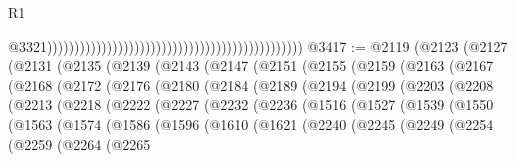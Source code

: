 \begin{lexlean}{R1}
\begin{coremodule}
                                                                                                  @3321)))))))))))))))))))))))))))))))))))))))))))))))
@3417 := @2119
    (@2123
      (@2127
        (@2131
          (@2135
            (@2139
              (@2143
                (@2147
                  (@2151
                    (@2155
                      (@2159
                        (@2163
                          (@2167
                            (@2168
                              (@2172
                                (@2176
                                  (@2180
                                    (@2184
                                      (@2189
                                        (@2194
                                          (@2199
                                            (@2203
                                              (@2208
                                                (@2213
                                                  (@2218
                                                    (@2222
                                                      (@2227
                                                        (@2232
                                                          (@2236
                                                            (@1516
                                                              (@1527
                                                                (@1539
                                                                  (@1550
                                                                    (@1563
                                                                      (@1574
                                                                        (@1586
                                                                          (@1596
                                                                            (@1610
                                                                              (@1621
                                                                                (@2240
                                                                                  (@2245
                                                                                    (@2249
                                                                                      (@2254
                                                                                        (@2259
                                                                                          (@2264
                                                                                            (@2265

\end{coremodule}
\end{lexlean}
